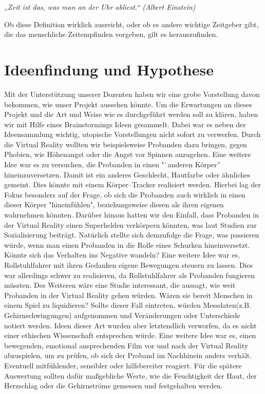 \documentclass{Bericht}
\begin{document}
	\textit{„Zeit ist das, was man an der Uhr abliest.“ (Albert Einstein)}

	Ob diese Definition wirklich ausreicht, oder ob es andere wichtige Zeitgeber gibt, die das menschliche Zeitempfinden vorgeben, gilt es herauszufinden. 

\section{Ideenfindung und Hypothese} %
	
	Mit der Unterstützung unserer Dozenten haben wir eine grobe Vorstellung davon bekommen, wie unser Projekt aussehen könnte. Um die Erwartungen an dieses Projekt und die Art und Weise wie es durchgeführt werden soll zu klären, haben wir mit Hilfe eines Brainstormings Ideen gesammelt. Dabei war es neben der Ideensammlung wichtig, utopische Vorstellungen nicht sofort zu verwerfen. Durch die Virtual Reality wollten wir beispielsweise Probanden dazu bringen, gegen Phobien, wie Höhenangst oder die Angst vor Spinnen anzugehen. Eine weitere Idee war es zu versuchen, die Probanden in einen "`anderen Körper'' hineinzuversetzen. Damit ist ein anderes Geschlecht, Hautfarbe oder ähnliches gemeint. Dies könnte mit einem Körper–Tracker realisiert werden. Hierbei lag der Fokus besonders auf der Frage, ob sich die Probanden auch wirklich in einen dieser Körper "hineinfühlen", beziehungsweise diesen als ihren eigenen wahrnehmen könnten. Darüber hinaus hatten wir den Einfall, dass Probanden in der Virtual Reality einen Superhelden verkörpern könnten, was laut Studien zur Sozialisierung beiträgt. 
Natürlich stellte sich demzufolge die Frage, was passieren würde, wenn man einen Probanden in die Rolle eines Schurken hineinversetzt. Könnte sich das Verhalten ins Negative wandeln? Eine weitere Idee war es, Rollstuhlfahrer mit ihren Gedanken eigene Bewegungen steuern zu lassen. Dies war allerdings schwer zu realisieren, da Rollstuhlfahrer als Probanden fungieren müssten. Des Weiteren wäre eine Studie interessant, die aussagt, wie weit Probanden in der Virtual Reality gehen würden. Wären sie bereit Menschen in einem Spiel zu liquidieren? Sollte dieser Fall eintreten, würden Messdaten(z.B. Gehirnschwingungen) aufgenommen und Veränderungen oder Unterschiede notiert werden. Ideen dieser Art wurden aber letztendlich verworfen, da es nicht einer ethischen Wissenschaft entsprechen würde. Eine weitere Idee war es, einen bewegenden, emotional ansprechenden Film vor und nach der Virtual Reality abzuspielen, um zu prüfen, ob sich der Proband im Nachhinein anders verhält. Eventuell mitfühlender, sensibler oder hilfsbereiter reagiert. Für die spätere Auswertung sollten dafür maßgebliche Werte, wie die Feuchtigkeit der Haut, der Herzschlag oder die Gehirnströme gemessen und festgehalten werden.
\end{document}
